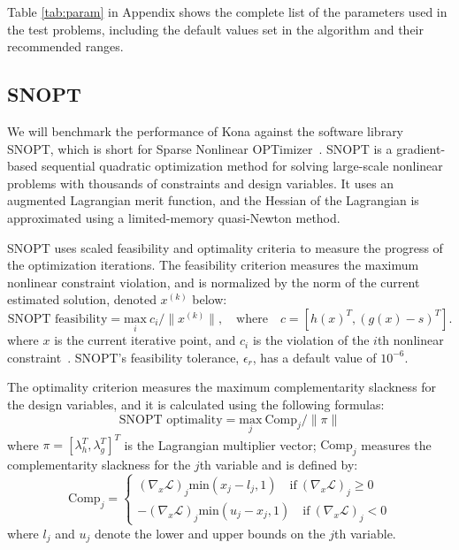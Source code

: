 Table \ref{tab:param} in Appendix shows the complete list of the parameters used in the test problems, including
the default values set in the algorithm and their recommended ranges.



\subsection{SNOPT}
We will benchmark the performance of Kona against the software library
SNOPT, which is short for Sparse Nonlinear OPTimizer~\cite{gill:2002}. SNOPT is a gradient-based sequential 
quadratic optimization method for solving large-scale nonlinear problems 
with thousands of constraints and design variables. It uses an augmented Lagrangian 
merit function, and the Hessian of the Lagrangian is approximated
using a limited-memory quasi-Newton method. 

SNOPT uses scaled feasibility and optimality criteria 
 to measure the progress of the 
optimization iterations. The feasibility criterion measures the maximum nonlinear constraint violation, 
and is normalized by the norm of the current estimated solution, denoted $x^{(k)}$ below:
\begin{equation*}
\text{SNOPT feasibility} = \underset{i}{\text{max}}  \  c_i / \lVert x^{(k)} \rVert, \quad \text{where} \quad 
c = \left[ h(x)^T,  (g(x) - s)^T \right].  %
\end{equation*}        
where $x$ is the current iterative point, and 
$c_i$ is the violation of the $i$th nonlinear constraint~\cite{snopt_manual}. SNOPT's feasibility tolerance, 
$\epsilon_r$, has a default value of $10^{-6}$. %

The optimality criterion measures the maximum complementarity slackness for the design variables, 
and it is calculated using the following formulas:
\begin{equation*}
\text{SNOPT optimality} = \underset{j}{\text{max}}  \ \text{Comp}_j / \lVert \pi \rVert 
\end{equation*}
where  $\pi = [\lambda_h^T, \lambda_g^T]^T$ is the Lagrangian multiplier vector; 
$\text{Comp}_j$ measures the complementarity slackness for the $j$th variable and is defined by:
\begin{equation*}
\text{Comp}_j = \begin{cases}
(\nabla_x \mathcal{L})_j \text{min} (x_j - l_j, 1)  \quad \text{if} \ (\nabla_x \mathcal{L})_j \geq 0 \\
-(\nabla_x \mathcal{L})_j \text{min} (u_j - x_j, 1) \quad \text{if} \ (\nabla_x \mathcal{L})_j < 0
\end{cases}
\end{equation*}
where $l_j$ and $u_j$ denote the lower and upper bounds on the $j$th variable. 

